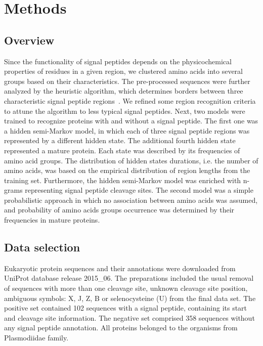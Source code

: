 \documentclass[10pt,letterpaper]{article}
\begin{document}
\section*{Methods}

\subsection*{Overview}

Since the functionality of signal peptides depends on the physicochemical properties of residues in a given region, we clustered amino acids into several groups based on their characteristics. The pre-processed sequences were further analyzed by the heuristic algorithm, which determines borders between three characteristic signal peptide regions~\cite{1998nielsenprediction}. We refined some region recognition criteria to attune the algorithm to less typical signal peptides. Next, two models were trained to recognize proteins with and without a signal peptide. The first one was a hidden semi-Markov model, in which each of three signal peptide regions was represented by a different hidden state. The additional fourth hidden state represented a mature protein. Each state was described by its frequencies of amino acid groups. The distribution of hidden states durations, i.e. the number of amino acids, was based on the empirical distribution of region lengths from the training set. Furthermore, the hidden semi-Markov model was enriched with n-grams representing signal peptide cleavage sites. The second model was a simple probabilistic approach in which no association between amino acids was assumed, and probability of amino acids groups occurrence was determined by their frequencies in mature proteins.

\subsection*{Data selection}

Eukaryotic protein sequences and their annotations were downloaded from UniProt database release 2015\_06. The preparations included the usual removal of sequences with more than one cleavage site, unknown cleavage site position, ambiguous symbols: X, J, Z, B or selenocysteine (U) from the final data set. The positive set contained 102 sequences with a signal peptide, containing its start and cleavage site information. The negative set comprised 358 sequences without any signal peptide annotation. All proteins belonged to the organisms from Plasmodiidae family.
\end{document}
